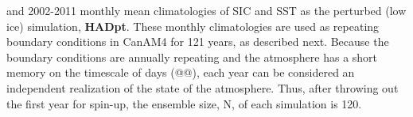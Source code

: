 \documentclass[twocol]{ametsoc}
\begin{document}




 and 2002-2011 monthly mean climatologies of SIC and SST as the perturbed (low ice) simulation, \textbf{HADpt}. These monthly climatologies are used as repeating boundary conditions in CanAM4 for 121 years, as described next. Because the boundary conditions are annually repeating and the atmosphere has a short memory on the timescale of days (@@), each year can be considered an independent realization of the state of the atmosphere. Thus, after throwing out the first year for spin-up, the ensemble size, N, of each simulation is 120.  %

\end{document}
